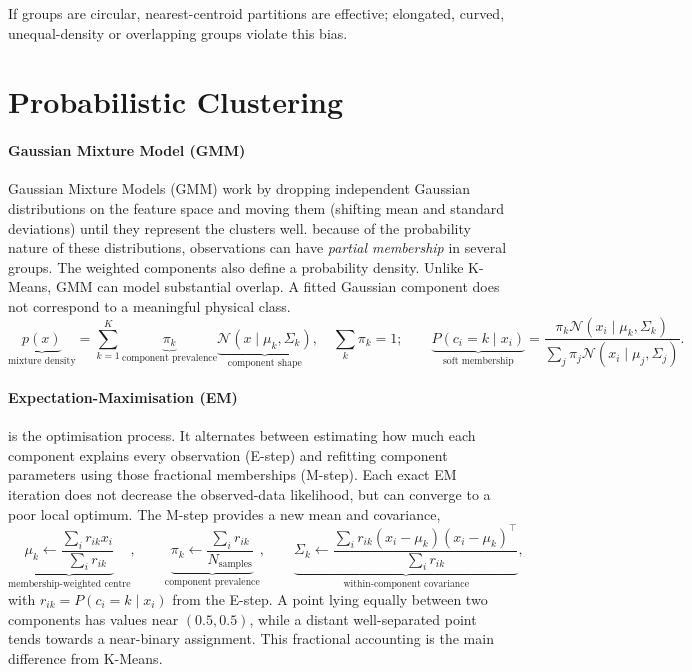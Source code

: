 \begin{calloutpractical}
    If groups are circular, nearest-centroid partitions are effective; elongated, curved, unequal-density or overlapping groups violate this bias.    
\end{calloutpractical}


\section{Probabilistic Clustering}
\label{sec:gmm}
\paragraph{Gaussian Mixture Model (GMM)}
Gaussian Mixture Models (GMM) work by dropping independent Gaussian distributions on the feature space and moving them (shifting mean and standard deviations) until they represent the clusters well.
because of the probability nature of these distributions, observations can have \emph{partial membership} in several groups.
The weighted components also define a probability density.
Unlike K-Means, GMM can model substantial overlap.
A fitted Gaussian component does not correspond to a meaningful physical class.
\[
    \underbrace{p(x)}_{\text{mixture density}}
    =\sum_{k=1}^{K}\underbrace{\pi_k}_{\text{component prevalence}}
    \underbrace{\mathcal N(x\mid\mu_k,\Sigma_k)}_{\text{component shape}},
    \quad \sum_k\pi_k=1;
    \qquad
    \underbrace{P(c_i=k\mid x_i)}_{\text{soft membership}}
    =\frac{\pi_k\mathcal N(x_i\mid\mu_k,\Sigma_k)}{\sum_j\pi_j\mathcal N(x_i\mid\mu_j,\Sigma_j)}.
\]
\paragraph{Expectation-Maximisation (EM)} is the optimisation process. 
It alternates between estimating how much each component explains every observation (E-step) and refitting component parameters using those fractional memberships (M-step).
Each exact EM iteration does not decrease the observed-data likelihood, but can converge to a poor local optimum.
The M-step provides a new mean and covariance,
\[
    \underbrace{\mu_k\gets\frac{\sum_i r_{ik}x_i}{\sum_i r_{ik}}}_{\text{membership-weighted centre}},\qquad
    \underbrace{\pi_k\gets\frac{\sum_i r_{ik}}{N_{\text{samples}}}}_{\text{component prevalence}},\qquad
    \underbrace{\Sigma_k\gets\frac{\sum_i r_{ik}(x_i-\mu_k)(x_i-\mu_k)^\top}{\sum_i r_{ik}}}_{\text{within-component covariance}},
\]
with $r_{ik}=P(c_i=k\mid x_i)$ from the E-step.
A point lying equally between two components has values near $(0.5,0.5)$, while a distant well-separated point tends towards a near-binary assignment.
This fractional accounting is the main difference from K-Means.


